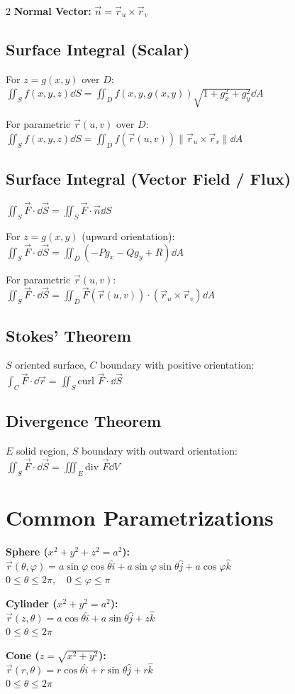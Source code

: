 \documentclass[8pt]{extarticle}
\begin{document}
\begin{multicols}{2}
\textbf{Normal Vector:} $\vec{n} = \vec{r}_u \times \vec{r}_v$

\subsection*{Surface Integral (Scalar)}
For $z = g(x,y)$ over $D$: \\
$\iint_S f(x,y,z) \dd{S} = \iint_D f(x,y,g(x,y)) \sqrt{1 + g_x^2 + g_y^2} \dd{A}$

For parametric $\vec{r}(u,v)$ over $D$: \\
$\iint_S f(x,y,z) \dd{S} = \iint_D f(\vec{r}(u,v)) \|\vec{r}_u \times \vec{r}_v\| \dd{A}$

\subsection*{Surface Integral (Vector Field / Flux)}
$\iint_S \vec{F} \cdot \dd{\vec{S}} = \iint_S \vec{F} \cdot \vec{n} \dd{S}$

For $z = g(x,y)$ (upward orientation): \\
$\iint_S \vec{F} \cdot \dd{\vec{S}} = \iint_D (-Pg_x - Qg_y + R) \dd{A}$

For parametric $\vec{r}(u,v)$: \\
$\iint_S \vec{F} \cdot \dd{\vec{S}} = \iint_D \vec{F}(\vec{r}(u,v)) \cdot (\vec{r}_u \times \vec{r}_v) \dd{A}$

\subsection*{Stokes' Theorem}
$S$ oriented surface, $C$ boundary with positive orientation: \\
$\int_C \vec{F} \cdot \dd{\vec{r}} = \iint_S \text{curl }\vec{F} \cdot \dd{\vec{S}}$

\subsection*{Divergence Theorem}
$E$ solid region, $S$ boundary with outward orientation: \\
$\iint_S \vec{F} \cdot \dd{\vec{S}} = \iiint_E \text{div }\vec{F} \dd{V}$

\section*{Common Parametrizations}

\textbf{Sphere ($x^2+y^2+z^2=a^2$):} \\
$\vec{r}(\theta,\varphi) = a\sin\varphi\cos\theta\hat{i} + a\sin\varphi\sin\theta\hat{j} + a\cos\varphi\hat{k}$ \\
$0 \le \theta \le 2\pi, \quad 0 \le \varphi \le \pi$

\textbf{Cylinder ($x^2+y^2=a^2$):} \\
$\vec{r}(z,\theta) = a\cos\theta\hat{i} + a\sin\theta\hat{j} + z\hat{k}$ \\
$0 \le \theta \le 2\pi$

\textbf{Cone ($z = \sqrt{x^2+y^2}$):} \\
$\vec{r}(r,\theta) = r\cos\theta\hat{i} + r\sin\theta\hat{j} + r\hat{k}$ \\
$0 \le \theta \le 2\pi$

\end{multicols}
\end{document}
